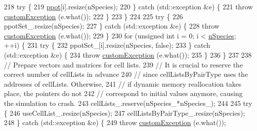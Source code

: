 \begin{DoxyCode}
218                                 \textcolor{keywordflow}{try} \{
219                                                 \hyperlink{classsim_system_a8d6271751a62f61edcf57f773540a4a3}{ppot}[i].resize(nSpecies);
220                                 \} \textcolor{keywordflow}{catch} (std::exception &e) \{
221                                                 \textcolor{keywordflow}{throw} \hyperlink{classcustom_exception}{customException} (e.what());
222                                 \}
223                 \}
224                 
225                 \textcolor{keywordflow}{try} \{
226                                 ppotSet\_.resize(nSpecies);
227                 \} \textcolor{keywordflow}{catch} (std::exception &e) \{
228                                 \textcolor{keywordflow}{throw} \hyperlink{classcustom_exception}{customException} (e.what());
229                 \}
230                 \textcolor{keywordflow}{for} (\textcolor{keywordtype}{unsigned} \textcolor{keywordtype}{int} i = 0; i < \hyperlink{classsim_system_ab5e2e9b6204de15520302fe1d51688dd}{nSpecies}; ++i) \{
231                                 \textcolor{keywordflow}{try} \{
232                                                 ppotSet\_[i].resize(nSpecies, \textcolor{keyword}{false});
233                                 \} \textcolor{keywordflow}{catch} (std::exception &e) \{
234                                                 \textcolor{keywordflow}{throw} \hyperlink{classcustom_exception}{customException} (e.what());
235                                 \}
236                 \}
237                 
238                 \textcolor{comment}{// Prepare vectors and matrices for cell lists.}
239                 \textcolor{comment}{// It is crucial to reserve the correct number of cellLists in advance}
240                 \textcolor{comment}{// since cellListsByPairType uses the addresses of cellLists. Otherwise,}
241                 \textcolor{comment}{// if dynamic memory reallocation takes place, the pointers do not}
242                 \textcolor{comment}{// correspond to initial values anymore, causing the simulation to crash.}
243                 cellLists\_.reserve(nSpecies\_*nSpecies\_); 
244                 
245                 \textcolor{keywordflow}{try} \{
246                                 useCellList\_.resize(nSpecies);
247                                 cellListsByPairType\_.resize(nSpecies);
248                 \} \textcolor{keywordflow}{catch} (std::exception &e) \{
249                                 \textcolor{keywordflow}{throw} \hyperlink{classcustom_exception}{customException} (e.what());

\end{DoxyCode}
